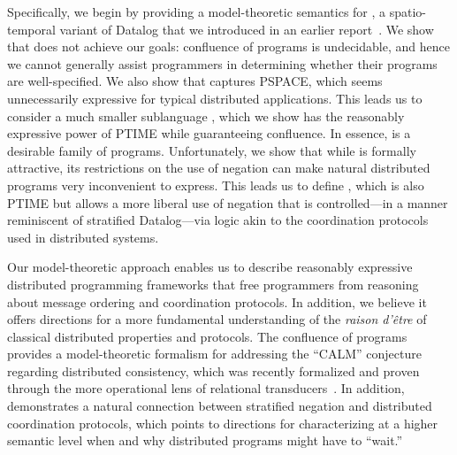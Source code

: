 Specifically, we begin by providing a model-theoretic semantics for \lang, a
spatio-temporal variant of Datalog that we introduced in an earlier
report~\cite{dedalus}.  We show that \lang does not achieve our goals:
confluence of \lang programs is undecidable, and hence we cannot generally
assist \lang programmers in determining whether their programs are
well-specified.  We also show that \lang captures PSPACE, which seems
unnecessarily expressive for typical distributed applications.  This leads us to
consider a much smaller sublanguage \slang, which we show has the reasonably
expressive power of PTIME while guaranteeing confluence. In essence, \slang is a
desirable family of \lang programs.  Unfortunately, we show that while \slang is
formally attractive, its restrictions on the use of negation can make natural
distributed programs very inconvenient to express.  This leads us to define
\plang, which is also PTIME but allows a more liberal use of negation that is
controlled---in a manner reminiscent of stratified Datalog---via logic akin to
the coordination protocols used in distributed systems.


Our model-theoretic approach enables us to describe reasonably expressive distributed programming frameworks that free programmers from reasoning about message ordering and coordination protocols.  In addition, we believe it offers directions for a more fundamental understanding of the {\em raison d'\^{e}tre} of classical distributed properties and protocols.
The confluence of \slang programs provides a model-theoretic formalism for addressing the ``CALM'' conjecture~\cite{declarative-imperative} regarding distributed consistency, which was recently formalized and proven through the more operational lens of relational transducers~\cite{relational-transducers}.  In addition, \plang demonstrates a natural connection between stratified negation and distributed coordination protocols, which points to directions for characterizing at a higher semantic level when and why distributed programs might have to ``wait.''



